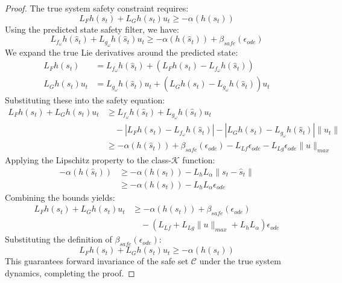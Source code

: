 \documentclass[manuscript, screen, review]{jair}
\begin{document}
\begin{proof}
The true system safety constraint requires:
\begin{equation*}
    L_F h(s_t) + L_G h(s_t) u_t \ge -\alpha(h(s_t))
\end{equation*}
Using the predicted state safety filter, we have:
\begin{equation*}
    L_{f_\omega} h(\hat{s}_t) + L_{g_\omega} h(\hat{s}_t) u_t \ge -\alpha(h(\hat{s}_t)) + \beta_{safe}(\epsilon_{ode})
\end{equation*}
We expand the true Lie derivatives around the predicted state:
\begin{align*}
    L_F h(s_t) &= L_{f_\omega} h(\hat{s}_t) + \left( L_F h(s_t) - L_{f_\omega} h(\hat{s}_t) \right) \\
    L_G h(s_t) u_t &= L_{g_\omega} h(\hat{s}_t) u_t + \left( L_G h(s_t) - L_{g_\omega} h(\hat{s}_t) \right) u_t
\end{align*}
Substituting these into the safety equation:
\begin{align*}
    L_F h(s_t) + L_G h(s_t) u_t &\ge L_{f_\omega} h(\hat{s}_t) + L_{g_\omega} h(\hat{s}_t) u_t \\
    &\quad - \left| L_F h(s_t) - L_{f_\omega} h(\hat{s}_t) \right| - \left| L_G h(s_t) - L_{g_\omega} h(\hat{s}_t) \right| \|u_t\| \\
    &\ge -\alpha(h(\hat{s}_t)) + \beta_{safe}(\epsilon_{ode}) - L_{Lf} \epsilon_{ode} - L_{Lg} \epsilon_{ode} \|u\|_{max}
\end{align*}
Applying the Lipschitz property to the class-$\mathcal{K}$ function:
\begin{align*}
    -\alpha(h(\hat{s}_t)) &\ge -\alpha(h(s_t)) - L_h L_\alpha \|s_t - \hat{s}_t\| \\
    &\ge -\alpha(h(s_t)) - L_h L_\alpha \epsilon_{ode}
\end{align*}
Combining the bounds yields:
\begin{align*}
    L_F h(s_t) + L_G h(s_t) u_t &\ge -\alpha(h(s_t)) + \beta_{safe}(\epsilon_{ode}) \\
    &\quad - \left( L_{Lf} + L_{Lg} \|u\|_{max} + L_h L_\alpha \right) \epsilon_{ode}
\end{align*}
Substituting the definition of $\beta_{safe}(\epsilon_{ode})$:
\begin{equation*}
    L_F h(s_t) + L_G h(s_t) u_t \ge -\alpha(h(s_t))
\end{equation*}
This guarantees forward invariance of the safe set $\mathcal{C}$ under the true system dynamics, completing the proof.
\end{proof}
\end{document}
